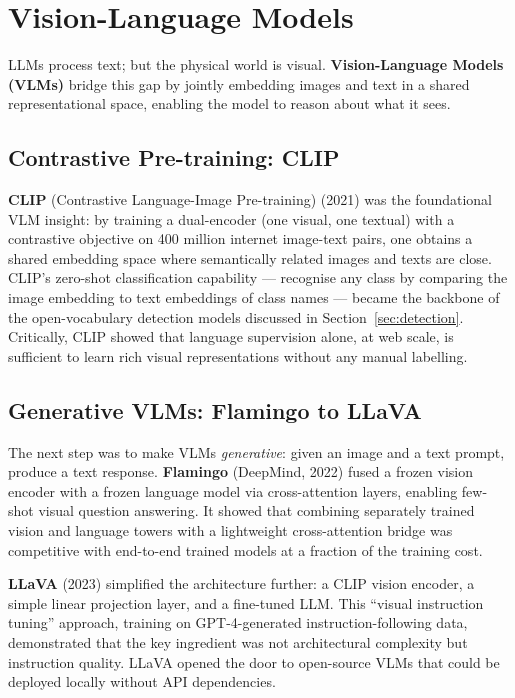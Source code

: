 \section{Vision-Language Models}
\label{sec:vlms}

LLMs process text; but the physical world is visual.
\textbf{Vision-Language Models (VLMs)} bridge this gap by jointly embedding images and
text in a shared representational space, enabling the model to reason about what it sees.

\subsection{Contrastive Pre-training: CLIP}

\textbf{CLIP} (Contrastive Language-Image Pre-training) \cite{radford2021clip} (2021)
was the foundational VLM insight: by training a dual-encoder (one visual, one textual)
with a contrastive objective on 400 million internet image-text pairs, one obtains a
shared embedding space where semantically related images and texts are close.
CLIP's zero-shot classification capability --- recognise any class by comparing the
image embedding to text embeddings of class names --- became the backbone of the
open-vocabulary detection models discussed in Section~\ref{sec:detection}.
Critically, CLIP showed that language supervision alone, at web scale, is sufficient
to learn rich visual representations without any manual labelling.

\subsection{Generative VLMs: Flamingo to LLaVA}

The next step was to make VLMs \emph{generative}: given an image and a text prompt,
produce a text response.
\textbf{Flamingo} \cite{alayrac2022flamingo} (DeepMind, 2022) fused a frozen vision
encoder with a frozen language model via cross-attention layers, enabling few-shot
visual question answering.
It showed that combining separately trained vision and language towers with a lightweight
cross-attention bridge was competitive with end-to-end trained models at a fraction of
the training cost.

\textbf{LLaVA} \cite{liu2023llava} (2023) simplified the architecture further:
a CLIP vision encoder, a simple linear projection layer, and a fine-tuned LLM.
This ``visual instruction tuning'' approach, training on GPT-4-generated
instruction-following data, demonstrated that the key ingredient was not architectural
complexity but instruction quality.
LLaVA opened the door to open-source VLMs that could be deployed locally without
API dependencies.

